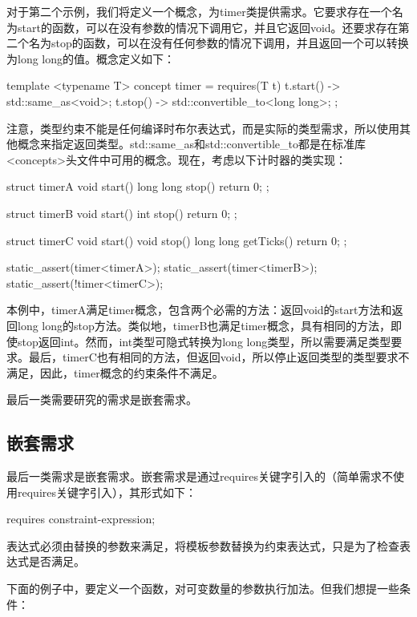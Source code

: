 对于第二个示例，我们将定义一个概念，为timer类提供需求。它要求存在一个名为start的函数，可以在没有参数的情况下调用它，并且它返回void。还要求存在第二个名为stop的函数，可以在没有任何参数的情况下调用，并且返回一个可以转换为long long的值。概念定义如下：

\begin{cpp}
template <typename T>
concept timer = requires(T t)
{
	{t.start()} -> std::same_as<void>;
	{t.stop()} -> std::convertible_to<long long>;
};
\end{cpp}

注意，类型约束不能是任何编译时布尔表达式，而是实际的类型需求，所以使用其他概念来指定返回类型。std::same\_as和std::convertible\_to都是在标准库<concepts>头文件中可用的概念。现在，考虑以下计时器的类实现：

\begin{cpp}
struct timerA
{
	void start() {}
	long long stop() { return 0; }
};

struct timerB
{
	void start() {}
	int stop() { return 0; }
};

struct timerC
{
	void start() {}
	void stop() {}
	long long getTicks() { return 0; }
};

static_assert(timer<timerA>);
static_assert(timer<timerB>);
static_assert(!timer<timerC>);
\end{cpp}

本例中，timerA满足timer概念，包含两个必需的方法：返回void的start方法和返回long long的stop方法。类似地，timerB也满足timer概念，具有相同的方法，即使stop返回int。然而，int类型可隐式转换为long long类型，所以需要满足类型要求。最后，timerC也有相同的方法，但返回void，所以停止返回类型的类型要求不满足，因此，timer概念的约束条件不满足。

最后一类需要研究的需求是嵌套需求。

\subsection{嵌套需求}

最后一类需求是嵌套需求。嵌套需求是通过requires关键字引入的（简单需求不使用requires关键字引入），其形式如下：

\begin{cpp}
requires constraint-expression;
\end{cpp}

表达式必须由替换的参数来满足，将模板参数替换为约束表达式，只是为了检查表达式是否满足。

下面的例子中，要定义一个函数，对可变数量的参数执行加法。但我们想提一些条件：

